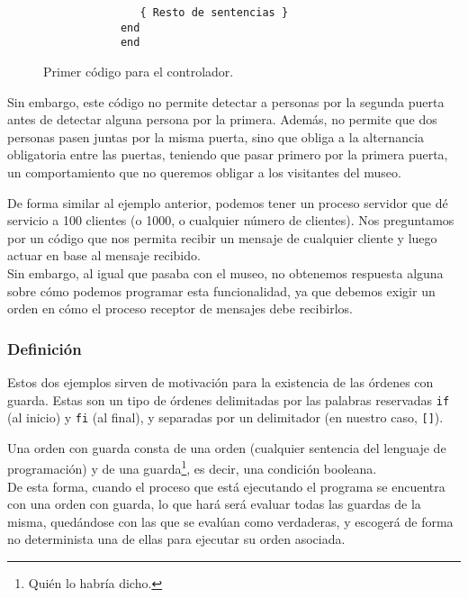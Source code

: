 \begin{ejemplo}
\begin{figure}
\begin{verbatim}
               { Resto de sentencias }
            end
            end
        \end{verbatim}
        \caption{Primer código para el controlador.}
        \label{fig:cod_museo_controlador}
    \end{figure}
    Sin embargo, este código no permite detectar a personas por la segunda puerta antes de detectar alguna persona por la primera. Además, no permite que dos personas pasen juntas por la misma puerta, sino que obliga a la alternancia obligatoria entre las puertas, teniendo que pasar primero por la primera puerta, un comportamiento que no queremos obligar a los visitantes del museo.
\end{ejemplo}

\begin{ejemplo}
    De forma similar al ejemplo anterior, podemos tener un proceso servidor que dé servicio a 100 clientes (o 1000, o cualquier número de clientes). Nos preguntamos por un código que nos permita recibir un mensaje de cualquier cliente y luego actuar en base al mensaje recibido.\\

    Sin embargo, al igual que pasaba con el museo, no obtenemos respuesta alguna sobre cómo podemos programar esta funcionalidad, ya que debemos exigir un orden en cómo el proceso receptor de mensajes debe recibirlos.
\end{ejemplo}

\subsubsection{Definición}
\noindent
Estos dos ejemplos sirven de motivación para la existencia de las órdenes con guarda. Estas son un tipo de órdenes delimitadas por las palabras reservadas \verb|if| (al inicio) y \verb|fi| (al final), y separadas por un delimitador (en nuestro caso, \verb|[]|). 

Una orden con guarda consta de una orden (cualquier sentencia del lenguaje de programación) y de una guarda\footnote{Quién lo habría dicho.}, es decir, una condición booleana.\\

De esta forma, cuando el proceso que está ejecutando el programa se encuentra con una orden con guarda, lo que hará será evaluar todas las guardas de la misma, quedándose con las que se evalúan como verdaderas, y escogerá de forma no determinista una de ellas para ejecutar su orden asociada.

